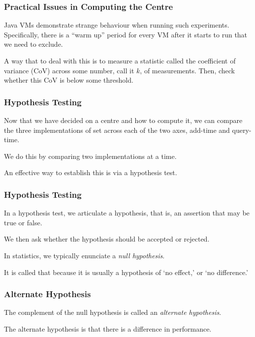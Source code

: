 \begin{frame}
\frametitle{Practical Issues in Computing the Centre}
\begin{changemargin}{1cm}

Java VMs demonstrate strange behaviour when running
	such experiments. Specifically, there is a ``warm up''
	period for every VM after it starts to run
	that we need to exclude.


	A way that to deal with this
	is to measure a statistic called the coefficient
	of variance (CoV) across some number, call it
	$k$, of measurements. Then, check whether this
	CoV is below some threshold.

\end{changemargin}
\end{frame}

\begin{frame}
\frametitle{Hypothesis Testing}
\begin{changemargin}{1cm}

Now that we have decided on a centre and how to compute it,
we can compare the three implementations of set across
each of the two axes, add-time and query-time.

We do this by comparing two implementations at a time.

An effective way to establish
this is via a hypothesis test.

\end{changemargin}
\end{frame}


\begin{frame}
\frametitle{Hypothesis Testing}
\begin{changemargin}{1cm}

In a hypothesis test, we articulate a hypothesis, that is,
an assertion that may be true or false. 

We then ask whether
the hypothesis should be accepted or rejected.

In statistics,
we typically enunciate a \emph{null hypothesis}.

It is called that because it is usually a hypothesis of
`no effect,' or `no difference.' 

\end{changemargin}
\end{frame}


\begin{frame}
\frametitle{Alternate Hypothesis}
\begin{changemargin}{1cm}

The complement of the null hypothesis is called an
\emph{alternate hypothesis}.

The alternate
hypothesis is that there is a difference in performance.

\end{changemargin}
\end{frame}


